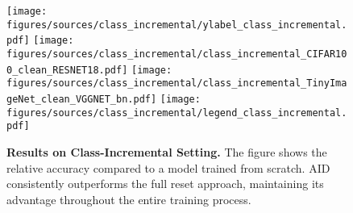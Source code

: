 

\begin{figure}[t]
    \centering
    \texttt{[image: figures/sources/class\_incremental/ylabel\_class\_incremental.pdf]}
    \texttt{[image: figures/sources/class\_incremental/class\_incremental\_CIFAR100\_clean\_RESNET18.pdf]}
    \texttt{[image: figures/sources/class\_incremental/class\_incremental\_TinyImageNet\_clean\_VGGNET\_bn.pdf]}
    \texttt{[image: figures/sources/class\_incremental/legend\_class\_incremental.pdf]}
    
    \caption{\textbf{Results on Class-Incremental Setting.} The figure shows the relative accuracy compared to a model trained from scratch. AID consistently outperforms the full reset approach, maintaining its advantage throughout the entire training process.}
    
    \label{exp_class_incremental}
\end{figure}

